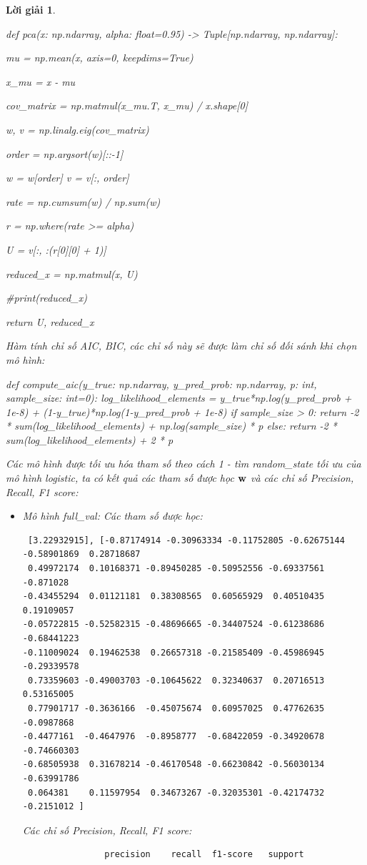 \documentclass[14pt, a4paper]{article}
\theoremstyle{sltheorem}
\theoremstyle{soltheorem}
\newtheorem*{loigiai}{Lời giải}
\begin{document}
\begin{loigiai}
    \begin{python}
def pca(x: np.ndarray, alpha: float=0.95) -> Tuple[np.ndarray, np.ndarray]:
    
    mu = np.mean(x, axis=0, keepdims=True)

    x_mu = x - mu

    cov_matrix = np.matmul(x_mu.T, x_mu) / x.shape[0]

    w, v = np.linalg.eig(cov_matrix)

    order = np.argsort(w)[::-1]

    w = w[order]
    v = v[:, order]

    rate = np.cumsum(w) / np.sum(w)

    r = np.where(rate >= alpha)

    U = v[:, :(r[0][0] + 1)]

    reduced_x = np.matmul(x, U)

    #print(reduced_x)

    return U, reduced_x
    \end{python}

    Hàm tính chỉ số AIC, BIC, các chỉ số này sẽ được làm chỉ số đối sánh khi chọn mô hình:

    \begin{python}
def compute_aic(y_true: np.ndarray, y_pred_prob: np.ndarray, p: int, sample_size: int=0):
    log_likelihood_elements = y_true*np.log(y_pred_prob + 1e-8) + (1-y_true)*np.log(1-y_pred_prob + 1e-8)
    if sample_size > 0:
        return -2 * sum(log_likelihood_elements) + np.log(sample_size) * p
    else:
        return -2 * sum(log_likelihood_elements) + 2 * p
    \end{python}

    Các mô hình được tối ưu hóa tham số theo cách 1 - tìm random\_state tối ưu của mô hình logistic, ta có kết quả các tham số được học $\bold{w}$ và các chỉ số Precision, Recall, F1 score:

    \begin{itemize}
        \item Mô hình full\_val:
        Các tham số được học:
        \begin{verbatim}
 [3.22932915], [-0.87174914 -0.30963334 -0.11752805 -0.62675144 -0.58901869  0.28718687
 0.49972174  0.10168371 -0.89450285 -0.50952556 -0.69337561 -0.871028
-0.43455294  0.01121181  0.38308565  0.60565929  0.40510435  0.19109057
-0.05722815 -0.52582315 -0.48696665 -0.34407524 -0.61238686 -0.68441223
-0.11009024  0.19462538  0.26657318 -0.21585409 -0.45986945 -0.29339578
 0.73359603 -0.49003703 -0.10645622  0.32340637  0.20716513  0.53165005
 0.77901717 -0.3636166  -0.45075674  0.60957025  0.47762635 -0.0987868
-0.4477161  -0.4647976  -0.8958777  -0.68422059 -0.34920678 -0.74660303
-0.68505938  0.31678214 -0.46170548 -0.66230842 -0.56030134 -0.63991786
 0.064381    0.11597954  0.34673267 -0.32035301 -0.42174732 -0.2151012 ]
        \end{verbatim}
        Các chỉ số Precision, Recall, F1 score:
        \begin{verbatim}
                precision    recall  f1-score   support


\end{verbatim}
\end{itemize}
\end{loigiai}
\end{document}
